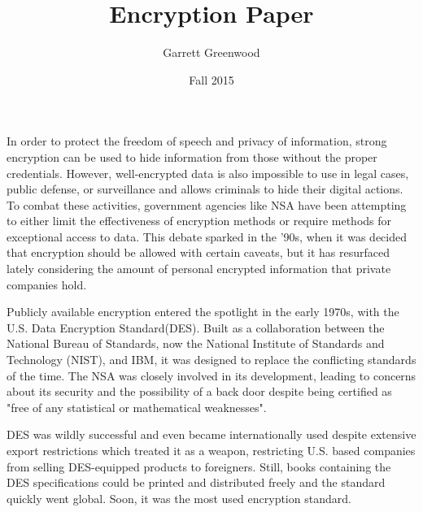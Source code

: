 \documentclass[12pt]{turabian-researchpaper}
\title{Encryption Paper}
\author{Garrett Greenwood}
\date{Fall 2015}
\begin{document}
\maketitle


In order to protect the freedom of speech and privacy of information, strong encryption can be used to hide information from those without the proper credentials.
However, well-encrypted data is also impossible to use in legal cases, public defense, or surveillance and allows criminals to hide their digital actions.
To combat these activities, government agencies like NSA have been attempting to either limit the effectiveness of encryption methods or require methods for exceptional access to data.
This debate sparked in the '90s, when it was decided that encryption should be allowed with certain caveats, but it has resurfaced lately considering the amount of personal encrypted information that private companies hold.

Publicly available encryption entered the spotlight in the early 1970s, with the U.S. Data Encryption Standard(DES).
Built as a collaboration between the National Bureau of Standards, now the National Institute of Standards and Technology (NIST), and IBM, it was designed to replace the conflicting standards of the time.
The NSA was closely involved in its development, leading to concerns about its security and the possibility of a back door despite being certified as "free of any statistical or mathematical weaknesses".

DES was wildly successful and even became internationally used despite extensive export restrictions which treated it as a weapon, restricting U.S. based companies from selling DES-equipped products to foreigners.
Still, books containing the DES specifications could be printed and distributed freely and the standard quickly went global.
Soon, it was the most used encryption standard.
\end{document}
